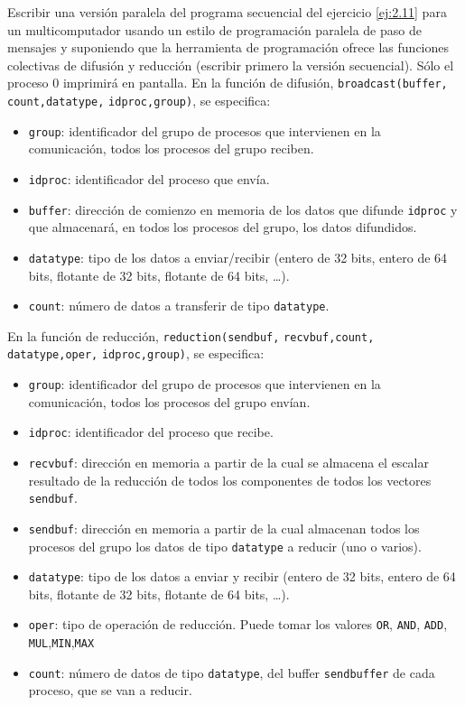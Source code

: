 \begin{ejercicio} \label{ej:2.12}
    Escribir una versión paralela del programa secuencial del ejercicio \ref{ej:2.11} para un multicomputador
    usando un estilo de programación paralela de paso de mensajes y suponiendo que la herramienta de
    programación ofrece las funciones colectivas de difusión y reducción (escribir primero la versión secuencial). 
    Sólo el proceso 0 imprimirá en pantalla. En la función de difusión,
    \verb|broadcast(buffer,| \verb|count,datatype,| \verb|idproc,group)|, se especifica:
    \begin{itemize}
        \item \verb|group|: identificador del grupo de procesos que intervienen en la comunicación, todos los procesos
        del grupo reciben.
        \item \verb|idproc|: identificador del proceso que envía.
        \item \verb|buffer|: dirección de comienzo en memoria de los datos que difunde \verb|idproc| y que almacenará,
        en todos los procesos del grupo, los datos difundidos.
        \item \verb|datatype|: tipo de los datos a enviar/recibir (entero de 32 bits, entero de 64 bits, flotante de 32
        bits, flotante de 64 bits, \dots).
        \item \verb|count|: número de datos a transferir de tipo \verb|datatype|.
    \end{itemize}
    En la función de reducción, \verb|reduction(sendbuf,| \verb|recvbuf,count,| \verb|datatype,oper,| \verb|idproc,group)|,
    se especifica:
    \begin{itemize}
        \item \verb|group|: identificador del grupo de procesos que intervienen en la comunicación, todos los procesos
        del grupo envían.
        \item \verb|idproc|: identificador del proceso que recibe.
        \item \verb|recvbuf|: dirección en memoria a partir de la cual se almacena el escalar resultado de la reducción
        de todos los componentes de todos los vectores \verb|sendbuf|.
        \item \verb|sendbuf|: dirección en memoria a partir de la cual almacenan todos los procesos del grupo los
        datos de tipo \verb|datatype| a reducir (uno o varios).
        \item \verb|datatype|: tipo de los datos a enviar y recibir (entero de 32 bits, entero de 64 bits, flotante de 32
        bits, flotante de 64 bits, \dots).
        \item \verb|oper|: tipo de operación de reducción. Puede tomar los valores \verb|OR|, \verb|AND|, \verb|ADD|, \verb|MUL|,\verb|MIN|,\verb|MAX|
        \item \verb|count|: número de datos de tipo \verb|datatype|, del buffer \verb|sendbuffer| de cada proceso, que se van a reducir.
    \end{itemize}
\end{ejercicio}

